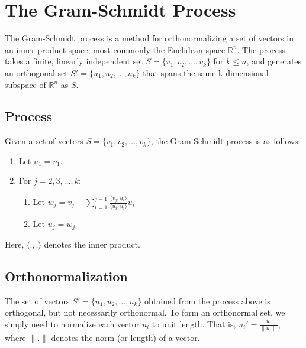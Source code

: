 \chapter{The Gram-Schmidt Process}

The Gram-Schmidt process is a method for orthonormalizing a set of vectors in an inner product space, most commonly the Euclidean space $\mathbb{R}^n$. The process takes a finite, linearly independent set $S = \{v_1, v_2, \ldots, v_k\}$ for $k \leq n$, and generates an orthogonal set $S' = \{u_1, u_2, \ldots, u_k\}$ that spans the same k-dimensional subspace of $\mathbb{R}^n$ as $S$.

\section{Process}

Given a set of vectors $S = \{v_1, v_2, \ldots, v_k\}$, the Gram-Schmidt process is as follows:

\begin{enumerate}
    \item Let $u_1 = v_1$.
    \item For $j = 2, 3, \ldots, k$:
    \begin{enumerate}
        \item Let $w_j = v_j - \sum_{i=1}^{j-1} \frac{\langle v_j, u_i \rangle}{\langle u_i, u_i \rangle} u_i$
        \item Let $u_j = w_j$
    \end{enumerate}
\end{enumerate}

Here, $\langle . , . \rangle$ denotes the inner product. 

\section{Orthonormalization}

The set of vectors $S' = \{u_1, u_2, \ldots, u_k\}$ obtained from the process above is orthogonal, but not necessarily orthonormal. To form an orthonormal set, we simply need to normalize each vector $u_i$ to unit length. That is, $u_i' = \frac{u_i}{\|u_i\|}$, where $\|.\|$ denotes the norm (or length) of a vector.


